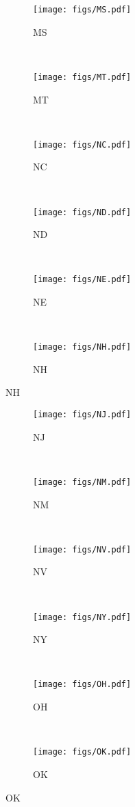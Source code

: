 \begin{figure}[tp]
	 \centering
	 \begin{subfigure}[b]{0.49\textwidth}
	 \centering
	 \texttt{[image: figs/MS.pdf]}
	 \caption{ MS }
	 \end{subfigure}
	 ~
	 \begin{subfigure}[b]{0.49\textwidth}
	 \centering
	 \texttt{[image: figs/MT.pdf]}
	 \caption{ MT }
	 \end{subfigure}
	 ~
	 \begin{subfigure}[b]{0.49\textwidth}
	 \centering
	 \texttt{[image: figs/NC.pdf]}
	 \caption{ NC }
	 \end{subfigure}
	 ~
	 \begin{subfigure}[b]{0.49\textwidth}
	 \centering
	 \texttt{[image: figs/ND.pdf]}
	 \caption{ ND }
	 \end{subfigure}
	 ~
	 \begin{subfigure}[b]{0.49\textwidth}
	 \centering
	 \texttt{[image: figs/NE.pdf]}
	 \caption{ NE }
	 \end{subfigure}
	 ~
	 \begin{subfigure}[b]{0.49\textwidth}
	 \centering
	 \texttt{[image: figs/NH.pdf]}
	 \caption{ NH }
	 \end{subfigure}
\end{figure}
\begin{figure}[tp]
	 \centering
	 \begin{subfigure}[b]{0.49\textwidth}
	 \centering
	 \texttt{[image: figs/NJ.pdf]}
	 \caption{ NJ }
	 \end{subfigure}
	 ~
	 \begin{subfigure}[b]{0.49\textwidth}
	 \centering
	 \texttt{[image: figs/NM.pdf]}
	 \caption{ NM }
	 \end{subfigure}
	 ~
	 \begin{subfigure}[b]{0.49\textwidth}
	 \centering
	 \texttt{[image: figs/NV.pdf]}
	 \caption{ NV }
	 \end{subfigure}
	 ~
	 \begin{subfigure}[b]{0.49\textwidth}
	 \centering
	 \texttt{[image: figs/NY.pdf]}
	 \caption{ NY }
	 \end{subfigure}
	 ~
	 \begin{subfigure}[b]{0.49\textwidth}
	 \centering
	 \texttt{[image: figs/OH.pdf]}
	 \caption{ OH }
	 \end{subfigure}
	 ~
	 \begin{subfigure}[b]{0.49\textwidth}
	 \centering
	 \texttt{[image: figs/OK.pdf]}
	 \caption{ OK }
	 \end{subfigure}
\end{figure}
